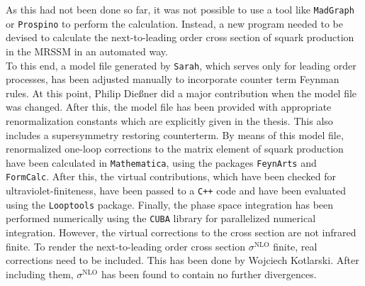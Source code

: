 As this had not been done so far, it was not possible to use a tool like \texttt{MadGraph} or \texttt{Prospino} to perform the calculation. Instead, a new program needed to be devised to calculate the next-to-leading order cross section of squark production in the MRSSM in an automated way.\\
To this end, a model file generated by \texttt{Sarah}, which serves only for leading order processes, has been adjusted manually to incorporate counter term Feynman rules. At this point, Philip Dießner did a major contribution when the model file was changed. After this, the model file has been provided with appropriate renormalization constants which are explicitly given in the thesis. This also includes  a supersymmetry restoring counterterm. By means of this model file, renormalized one-loop corrections to the matrix element of squark production have been calculated in \texttt{Mathematica}, using the packages \texttt{FeynArts} and \texttt{FormCalc}. After this, the virtual contributions, which have been checked for ultraviolet-finiteness, have been passed to a \texttt{C++} code and have been evaluated using the \texttt{Looptools} package. Finally, the phase space integration has been performed numerically using the \texttt{CUBA} library for parallelized numerical integration. However, the virtual corrections to the cross section are not infrared finite. To render the next-to-leading order cross section $\sigma^{\mathrm{NLO}}$ finite, real corrections need to be included. This has been done by Wojciech Kotlarski. After including them, $\sigma^{\mathrm{NLO}}$ has been found to contain no further divergences.
